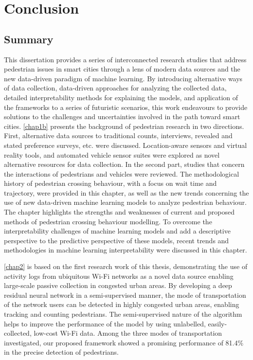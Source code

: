 \part{Conclusion}

\chapter{Summary}
\label{chap7}
This dissertation provides a series of interconnected research studies that address pedestrian issues in smart cities through a lens of modern data sources and the new data-driven paradigm of machine learning. By introducing alternative ways of data collection, data-driven approaches for analyzing the collected data, detailed interpretability methods for explaining the models, and application of the frameworks to a series of futuristic scenarios, this work endeavours to provide solutions to the challenges and uncertainties involved in the path toward smart cities. \cref{chap1b} presents the background of pedestrian research in two directions. First, alternative data sources to traditional counts, interviews, revealed and stated preference surveys, etc. were discussed. Location-aware sensors and virtual reality tools, and automated vehicle sensor suites were explored as novel alternative resources for data collection. In the second part, studies that concern the interactions of pedestrians and vehicles were reviewed. The methodological history of pedestrian crossing behaviour, with a focus on wait time and trajectory, were provided in this chapter, as well as the new trends concerning the use of new data-driven machine learning models to analyze pedestrian behaviour. The chapter highlights the strengths and weaknesses of current and proposed methods of pedestrian crossing behaviour modelling. To overcome the interpretability challenges of machine learning models and add a descriptive perspective to the predictive perspective of these models, recent trends and methodologies in machine learning interpretability were discussed in this chapter.

\cref{chap2} is based on the first research work of this thesis, demonstrating the use of activity logs from ubiquitous Wi-Fi networks as a novel data source enabling large-scale passive collection in congested urban areas. By developing a deep residual neural network in a semi-supervised manner, the mode of transportation of the network users can be detected in highly congested urban areas, enabling tracking and counting pedestrians. The semi-supervised nature of the algorithm helps to improve the performance of the model by using unlabelled, easily-collected, low-cost Wi-Fi data. Among the three modes of transportation investigated, our proposed framework showed a promising performance of 81.4\% in the precise detection of pedestrians.

